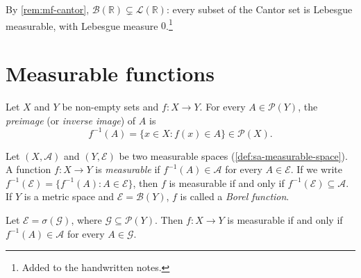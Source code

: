 By \cref{rem:mf-cantor}, $\mathcal B(\mathbb R)\subsetneq\mathcal L(\mathbb R)$: every subset of
the Cantor set is Lebesgue measurable, with Lebesgue measure $0$.\footnote{Added to the
handwritten notes.}

\section{Measurable functions}\label{sec:mf-measurable}

\begin{definition}[Preimage]\label{def:mf-preimage}
Let $X$ and $Y$ be non-empty sets and $f:X\to Y$. For every $A\in\mathcal P(Y)$, the
\emph{preimage} (or \emph{inverse image}) of $A$ is
\[
  f^{-1}(A)=\{x\in X:f(x)\in A\}\in\mathcal P(X).
\]
\end{definition}

\begin{definition}\label{def:mf-measurable}
Let $(X,\mathcal A)$ and $(Y,\mathcal E)$ be two measurable spaces
(\cref{def:sa-measurable-space}). A function $f:X\to Y$ is \emph{measurable} if
$f^{-1}(A)\in\mathcal A$ for every $A\in\mathcal E$. If we write
$f^{-1}(\mathcal E)=\{f^{-1}(A):A\in\mathcal E\}$, then $f$ is measurable if and only if
$f^{-1}(\mathcal E)\subseteq\mathcal A$. If $Y$ is a metric space and $\mathcal E=\mathcal B(Y)$,
$f$ is called a \emph{Borel function}.
\end{definition}

\begin{proposition}\label{prop:mf-generators}
Let $\mathcal E=\sigma(\mathcal G)$, where $\mathcal G\subseteq\mathcal P(Y)$. Then $f:X\to Y$ is
measurable if and only if $f^{-1}(A)\in\mathcal A$ for every $A\in\mathcal G$.
\end{proposition}

